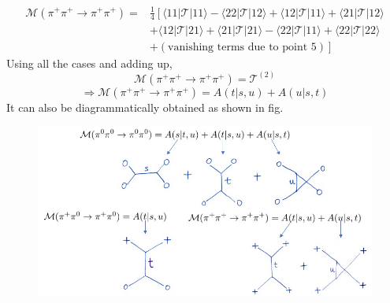 ﻿\documentclass[12pt,a4paper]{article}
\begin{document}
$$\begin{aligned} \mathcal{M}(\pi^{+} \pi^{+} \rightarrow \pi^{+}\pi^{+})=&\frac{1}{4} \left[\langle11|\mathcal{T}|11\rangle-\langle22|\mathcal{T}|12\rangle+\langle12|\mathcal{T}|11\rangle+\langle21|\mathcal{T}|12\rangle\right. \\
&\left.+\langle12|\mathcal{T}|21\rangle+\langle21|\mathcal{T}|21\rangle-\langle22|\mathcal{T}|11\rangle+\langle22|\mathcal{T}|22\rangle \right.\\
&\left.+(\text{vanishing terms due to point 5})\right] \end{aligned}$$
Using all the cases and adding up,  
$$\mathcal{M}(\pi^{+} \pi^{+} \rightarrow \pi^{+}\pi^{+})=\mathcal{T}^{(2)}$$
$$\Rightarrow \mathcal{M}(\pi^{+} \pi^{+} \rightarrow \pi^{+}\pi^{+})=A(t|s, u)+A(u|s, t)$$
It can also be diagrammatically obtained as shown in fig.
\begin{figure}[H]
  \centering
  \includegraphics[width=12cm]{8.jpg}
  \caption{}
  \label{fig:1}
\end{figure}
\end{document}
